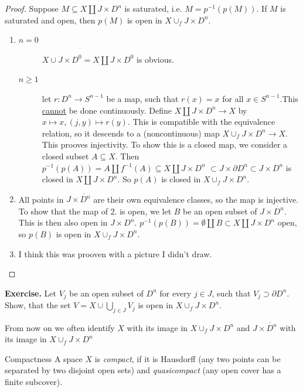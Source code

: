 \documentclass{TemplateLecture}
\begin{document}
\begin{proof}
    Suppose \(M \subseteq X \amalg J\times D^n\) is saturated, i.e. \(M = p^{-1}(p(M))\). If \(M\) is saturated and open, then \(p(M)\) is open in \(X\cup_f J\times D^n\).
    \begin{enumerate}
        \item \begin{description}
            \item[\(n = 0\)] \(X\cup J\times D^0 = X \amalg J\times D^0\) is obvious.
            \item[\(n \geq 1\)] let \(r\colon D^n \to S^{n-1}\) be a map, such that \(r(x) = x\) for all \(x \in S^{n-1}\).This \underline{cannot} be done continuously.
            Define \(X \amalg J\times D^n \to X\) by \(x \mapsto x, (j,y) \mapsto r(y)\). This is compatible with the equivalence relation, so it descends to a (noncontinuous) map \(X \cup_f J\times D^n \to X\). This prooves injectivity.
            To show this is a closed map, we consider a closed subset \(A \subseteq X\). Then
            \(p^{-1}(p(A)) = A\amalg f^{-1}(A) \subseteq X\amalg J\times D^n\)
            \(\subset J\times \partial D^n \subset J\times D^n\) is closed in \(X \amalg J\times D^n\).
            So \(p(A)\) is closed in \(X\cup_f J\times D^n\).
        \end{description}
        \item All points in \(J \times \mathring{D^n}\) are their own equivalence classes, so the map is injective. To show that the map of 2. is open, we let \(B\) be an open subset of \(J\times \mathring{D^n}\). This is then also open in \(J \times D^n\). \(p^{-1}(p(B)) = \emptyset \amalg B\subset X\amalg J\times D^n\) open, so \(p(B)\) is open in \(X\cup_f J\times D^n\).
        
        \item I think this was prooven with a picture I didn't draw.
    \end{enumerate}
\end{proof}

\textbf{Exercise.} Let \(V_j\) be an open subset of \(D^n\) for every \(j \in J\), such that \(V_j \supset \partial D^n\). Show, that the set \(V = X \cup \bigcup_{j \in J} V_j\) is open in \(X\cup_f J\times D^n\).

From now on we often identify \(X\) with its image in \(X \cup_f J\times D^n\) and \(J\times \mathring{D^n}\) with its image in \(X \cup_f J\times D^n\)

\begin{defi}{Compactness}{}
    A space \(X\) is \emph{compact}, if it is Hausdorff (any two points can be separated by two disjoint open sets) and \emph{quasicompact} (any open cover has a finite subcover).
\end{defi}
\end{document}
